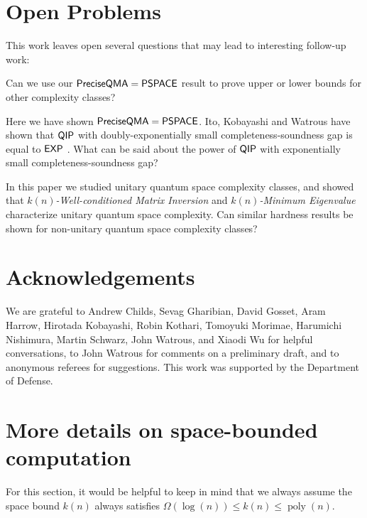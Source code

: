 \documentclass[11pt]{article}
\newtheorem{corollary}[theorem]{Corollary}
\theoremstyle{definition}
\theoremstyle{remark}
\newcommand\EXP{{\sf{EXP}}}
\newcommand\QIP{{\sf{QIP}}}
\newcommand\PSPACE{{\sf{PSPACE}}}
\newcommand\preciseQMA{{\sf{PreciseQMA}}}
\newcommand\matrixinvert[1]{{\ensuremath{#1}}\textit{-Well-conditioned Matrix Inversion}}
\newcommand\spechamiltonian[1]{\ensuremath{#1}\textit{-Minimum Eigenvalue}}
\newcommand{\classfont}{\sf}
\newcommand{\Unitary}{\mathbf{U}}
\newcommand{\unitaryQSPACE}[3]{{\classfont{Q}_\Unitary\classfont{SPACE}}[#1](#2,#3)}
\DeclareMathOperator{\poly}{poly}
\begin{document}
%


\section{Open Problems}
This work leaves open several questions that may lead to interesting follow-up work:
\begin{compactenum}
\begin{item} Can we use our $\preciseQMA=\PSPACE$ result to prove upper or lower bounds for other complexity classes? \end{item}
\begin{item} Here we have shown $\preciseQMA=\PSPACE$.  Ito, Kobayashi and Watrous  have shown that $\QIP$ with doubly-exponentially small completeness-soundness gap is equal to $\EXP$ \cite{ikw12}.  What can be said about the power of $\QIP$ with exponentially small completeness-soundness gap?\end{item}
\begin{item}In this paper we studied unitary quantum space complexity classes, and showed that \matrixinvert{k(n)} and \spechamiltonian{k(n)} characterize unitary quantum space complexity.  Can similar hardness results be shown for non-unitary quantum space complexity classes?\end{item}
\end{compactenum}


\section{Acknowledgements}
We are grateful to Andrew Childs, Sevag Gharibian, David Gosset, Aram Harrow, Hirotada Kobayashi, Robin Kothari, Tomoyuki Morimae, Harumichi Nishimura, Martin Schwarz, John Watrous, and Xiaodi Wu for helpful conversations, to John Watrous for comments on a preliminary draft, and to anonymous referees for suggestions. This work was supported by the Department of Defense.

\appendix

\section{More details on space-bounded computation}\label{app: space bounded}
For this section, it would be helpful to keep in mind that we always assume the space bound $k(n)$ always satisfies $\Omega(\log(n)) \le k(n) \le \poly(n)$.
\end{document}
